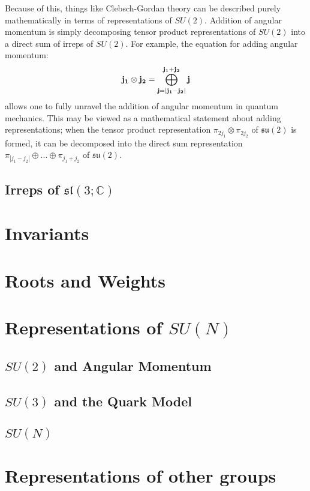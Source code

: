 \documentclass[11pt, oneside]{article}   	%
\theoremstyle{definition}
\begin{document}
Because of this, things like Clebsch-Gordan theory can be described purely mathematically in terms of representations 
of $SU(2)$. Addition of angular momentum is simply decomposing tensor product representations of $SU(2)$ into a 
direct sum of irreps of $SU(2)$. For example, the equation for adding angular momentum:
\begin{equation}
	\bf{j_1}\otimes j_2 = \bigoplus_{j = |j_1 - j_2|}^{j_1 + j_2} j
\end{equation}
allows one to fully unravel the addition of angular momentum in quantum mechanics. This may be viewed as a mathematical 
statement about adding representations; when the tensor product representation $\pi_{2j_1}\otimes\pi_{2j_2}$ of $\mathfrak{su}(2)$ 
is formed, it can be decomposed into the direct sum representation $\pi_{|j_1 - j_2|}\oplus ...\oplus\pi_{j_1 + j_2}$ of $\mathfrak{su}(2)$. 

\subsection{Irreps of $\mathfrak{sl}(3; \mathbb C)$}

\section{Invariants}

\section{Roots and Weights}

\section{Representations of $SU(N)$}

\subsection{$SU(2)$ and Angular Momentum}

\subsection{$SU(3)$ and the Quark Model}

\subsection{$SU(N)$}

\section{Representations of other groups}
\end{document}
